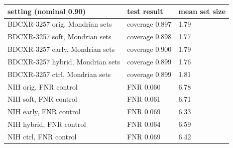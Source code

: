 \begin{tabular}{lll}
\toprule
setting (nominal 0.90) & test result & mean set size \\
\midrule
BDCXR-3257 orig, Mondrian sets & coverage 0.897 & 1.79 \\
BDCXR-3257 soft, Mondrian sets & coverage 0.898 & 1.77 \\
BDCXR-3257 early, Mondrian sets & coverage 0.900 & 1.79 \\
BDCXR-3257 hybrid, Mondrian sets & coverage 0.899 & 1.76 \\
BDCXR-3257 ctrl, Mondrian sets & coverage 0.899 & 1.81 \\
NIH orig, FNR control & FNR 0.060 & 6.78 \\
NIH soft, FNR control & FNR 0.061 & 6.71 \\
NIH early, FNR control & FNR 0.069 & 6.33 \\
NIH hybrid, FNR control & FNR 0.064 & 6.59 \\
NIH ctrl, FNR control & FNR 0.069 & 6.42 \\
\bottomrule
\end{tabular}
